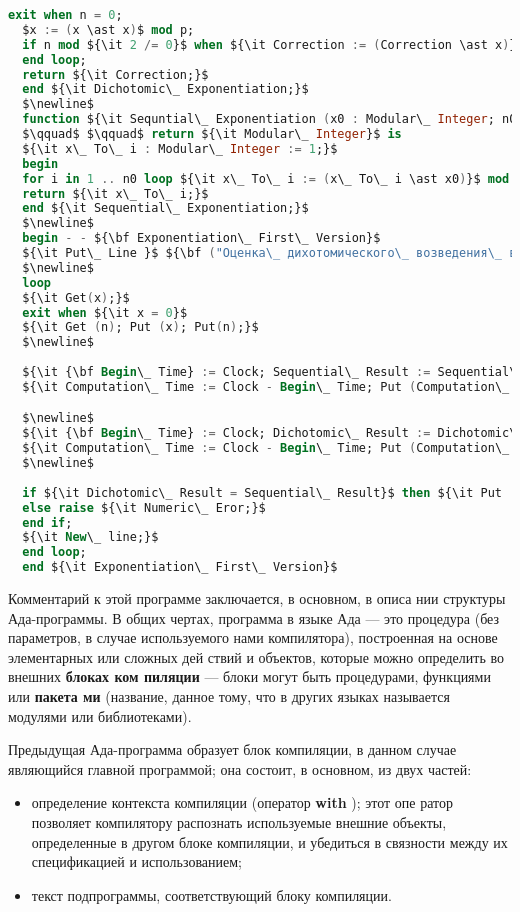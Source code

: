 \newpage
\begin{lstlisting}[mathescape=true, language=Ada, basicstyle=\small]
  exit when n = 0;
  $x := (x \ast x)$ mod p;
  if n mod ${\it 2 /= 0}$ when ${\it Correction := (Correction \ast x)}$ mod p;
  end loop;
  return ${\it Correction;}$
  end ${\it Dichotomic\_ Exponentiation;}$
  $\newline$
  function ${\it Sequntial\_ Exponentiation (x0 : Modular\_ Integer; n0 : Long\_ Intege)}$
  $\qquad$ $\qquad$ return ${\it Modular\_ Integer}$ is
  ${\it x\_ To\_ i : Modular\_ Integer := 1;}$
  begin
  for i in 1 .. n0 loop ${\it x\_ To\_ i := (x\_ To\_ i \ast x0)}$ mod p; end loop;
  return ${\it x\_ To\_ i;}$
  end ${\it Sequential\_ Exponentiation;}$
  $\newline$
  begin - - ${\bf Exponentiation\_ First\_ Version}$
  ${\it Put\_ Line }$ ${\bf ("Оценка\_ дихотомического\_ возведения\_ в\_ степень.\_");}$
  $\newline$
  loop
  ${\it Get(x);}$
  exit when ${\it x = 0}$
  ${\it Get (n); Put (x); Put(n);}$
  $\newline$
  
  ${\it {\bf Begin\_ Time} := Clock; Sequential\_ Result := Sequential\_ Exponentiation (x, n);}$
  ${\it Computation\_ Time := Clock - Begin\_ Time; Put (Computation\_ Time);}$

  $\newline$
  ${\it {\bf Begin\_ Time} := Clock; Dichotomic\_ Result := Dichotomic\_ Exponentiation (x, n);}$
  ${\it Computation\_ Time := Clock - Begin\_ Time; Put (Computation\_ Time);}$
  $\newline$
  
  if ${\it Dichotomic\_ Result = Sequential\_ Result}$ then ${\it Put  (Dichotomic\_ Result);}$
  else raise ${\it Numeric\_ Eror;}$
  end if;
  ${\it New\_ line;}$
  end loop;
  end ${\it Exponentiation\_ First\_ Version}$
  \end{lstlisting} 

Комментарий к этой программе заключается, в основном, в описа­
нии структуры Ада-программы. В общих чертах, программа в языке
Ада — это процедура (без параметров, в случае используемого нами
компилятора), построенная на основе элементарных или сложных дей­
ствий и объектов, которые можно определить во внешних {\bf блоках ком­
пиляции} — блоки могут быть процедурами, функциями или {\bf пакета­
ми} (название, данное тому, что в других языках называется модулями
или библиотеками).

\newpage
Предыдущая Ада-программа образует блок компиляции, в данном
случае являющийся главной программой; она состоит, в основном, из
двух частей:
\begin{itemize}
\item определение контекста компиляции (оператор {\bf with} ); этот опе­
ратор позволяет компилятору распознать используемые внешние
объекты, определенные в другом блоке компиляции, и убедиться
в связности между их спецификацией и использованием;
\item текст подпрограммы, соответствующий блоку компиляции.
\end{itemize}

